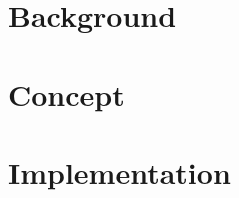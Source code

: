 \documentclass[a4paper, oneside]{book}
\begin{document}

\chapter{Background}

\label{chapter:background}


















\chapter{Concept}

\label{chapter:concept}
















\chapter{Implementation}

\label{chapter:implementation}








\end{document}

